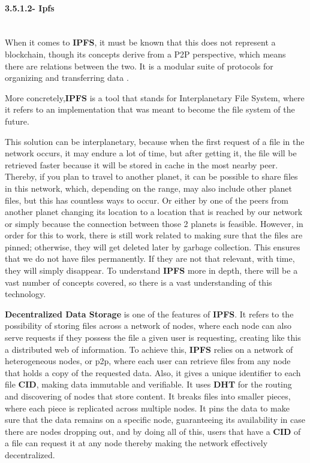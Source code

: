 \paragraph{3.5.1.2- Ipfs}\mbox{}\\
When it comes to \textbf{IPFS}, it must be known that this does not represent a blockchain, though its concepts derive from a P2P perspective, which means there are relations between the two. It is a modular suite of protocols for organizing and transferring data \cite{ipfs}.

More concretely,\textbf{IPFS} is a tool that stands for Interplanetary File System, where it refers to an implementation that was meant to become the file system of the future.

This solution can be interplanetary, because when the first request of a file in the network occurs, it may endure a lot of time, but after getting it, the file will be retrieved faster because it will be stored in cache in the most nearby peer. Thereby, if you plan to travel to another planet, it can be possible to share files in this network, which, depending on the range, may also include other planet files, but this has countless ways to occur. Or either by one of the peers from another planet changing its location to a location that is reached by our network or simply because the connection between those 2 planets is feasible. However, in order for this to work, there is still work related to making sure that the files are pinned; otherwise, they will get deleted later by garbage collection. This ensures that we do not have files permanently. If they are not that relevant, with time, they will simply disappear. To understand \textbf{IPFS} more in depth, there will be a vast number of concepts covered, so there is a vast understanding of this technology\cite{ipfs-overview}.

\textbf{Decentralized Data Storage} is one of the features of \textbf{IPFS}. It refers to the possibility of storing files across a network of nodes, where each node can also serve requests if they possess the file a given user is requesting, creating like this a distributed web of information. To achieve this, \textbf{IPFS} relies on a network of heterogeneous nodes, or p2p, where each user can retrieve files from any node that holds a copy of the requested data. Also, it gives a unique identifier to each file \textbf{CID}, making data immutable and verifiable. It uses \textbf{DHT} for the routing and discovering of nodes that store content. It breaks files into smaller pieces, where each piece is replicated across multiple nodes. It pins the data to make sure that the data remains on a specific node, guaranteeing its availability in case there are nodes dropping out, and by doing all of this, users that have a \textbf{CID} of a file can request it at any node thereby making the network effectively decentralized.

